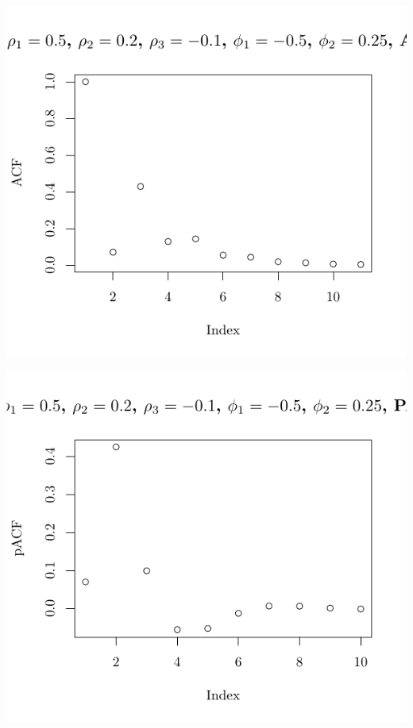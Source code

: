 \documentclass[10pt]{paper}\usepackage[]{graphicx}\usepackage[]{color}
\makeatletter
\def\maxwidth{ %
  \ifdim\Gin@nat@width>\linewidth
    \linewidth
  \else
    \Gin@nat@width
  \fi
}
\newenvironment{knitrout}{}{} %
\makeatother
\begin{document}
\begin{knitrout}
{\centering \includegraphics[width=\maxwidth]{figure/graphics-plotter-195} 

}




{\centering \includegraphics[width=\maxwidth]{figure/graphics-plotter-196} 

}





\end{knitrout}
\end{document}
